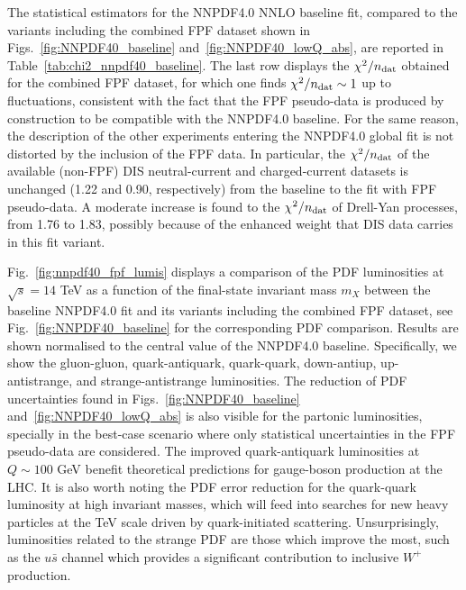
The statistical estimators for the NNPDF4.0 NNLO
baseline fit, compared to the variants including
the combined FPF dataset shown in Figs.~\ref{fig:NNPDF40_baseline}
and~\ref{fig:NNPDF40_lowQ_abs}, are reported in Table~\ref{tab:chi2_nnpdf40_baseline}.
%
The last row displays the $\chi^2/n_{\rm dat}$ obtained for the combined FPF dataset,
for which one finds $\chi^2/n_{\rm dat} \sim 1$ up to fluctuations, consistent
with the fact that the FPF pseudo-data
is produced by construction to be compatible with the NNPDF4.0 baseline.
%
For the same reason, the description of the other experiments entering
the NNPDF4.0 global fit is not distorted by the inclusion of the FPF data.
%
In particular, the $\chi^2/n_{\rm dat}$ of the available (non-FPF) DIS neutral-current and charged-current
datasets is unchanged (1.22 and 0.90, respectively) from the baseline to the fit with FPF pseudo-data.
%
A moderate increase is found to the $\chi^2/n_{\rm dat}$ of Drell-Yan processes, from 1.76 to 1.83, possibly
because of the enhanced weight that DIS data carries in this fit variant.

Fig.~\ref{fig:nnpdf40_fpf_lumis} displays a comparison of the PDF luminosities at $\sqrt{s}=14$ TeV
as a function of the final-state invariant mass $m_X$ between
the baseline NNPDF4.0 fit and its variants including the combined FPF dataset,
see Fig.~\ref{fig:NNPDF40_baseline} for the corresponding PDF comparison.
%
Results are shown normalised to the central value of the NNPDF4.0 baseline.
%
Specifically, we show the gluon-gluon, quark-antiquark, 
quark-quark, down-antiup, up-antistrange, and strange-antistrange  luminosities.
%
The reduction of PDF uncertainties found in  Figs.~\ref{fig:NNPDF40_baseline}
and~\ref{fig:NNPDF40_lowQ_abs} is also visible
for the partonic luminosities, specially in the best-case scenario where only statistical
uncertainties in the FPF pseudo-data are considered.
%
The improved quark-antiquark luminosities at $Q\sim 100$ GeV
benefit theoretical predictions for gauge-boson production at the LHC.
%
It is also worth noting the PDF error reduction for the quark-quark luminosity at
high invariant masses,
which will feed into searches for new heavy particles at the TeV scale
driven by quark-initiated scattering.
%
Unsurprisingly, luminosities related to the strange PDF are those
which improve the most, such as the $u\bar{s}$ channel which provides a significant
contribution to inclusive $W^+$ production.

